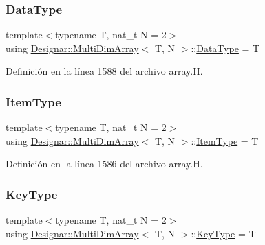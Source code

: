 \subsubsection{\texorpdfstring{Data\+Type}{DataType}}
{\footnotesize\ttfamily template$<$typename T, nat\+\_\+t N = 2$>$ \\
using \hyperlink{class_designar_1_1_multi_dim_array}{Designar\+::\+Multi\+Dim\+Array}$<$ T, N $>$\+::\hyperlink{class_designar_1_1_multi_dim_array_a23b3bec3a6a803d8ef7becceb592d6c0}{Data\+Type} =  T}



Definición en la línea 1588 del archivo array.\+H.

\mbox{\label{class_designar_1_1_multi_dim_array_a1b4c346c7e11cbada54447843d0c7880}} 
\subsubsection{\texorpdfstring{Item\+Type}{ItemType}}
{\footnotesize\ttfamily template$<$typename T, nat\+\_\+t N = 2$>$ \\
using \hyperlink{class_designar_1_1_multi_dim_array}{Designar\+::\+Multi\+Dim\+Array}$<$ T, N $>$\+::\hyperlink{class_designar_1_1_multi_dim_array_a1b4c346c7e11cbada54447843d0c7880}{Item\+Type} =  T}



Definición en la línea 1586 del archivo array.\+H.

\mbox{\label{class_designar_1_1_multi_dim_array_aa8c6b455e3cd5b74a57243a13553c6ff}} 
\subsubsection{\texorpdfstring{Key\+Type}{KeyType}}
{\footnotesize\ttfamily template$<$typename T, nat\+\_\+t N = 2$>$ \\
using \hyperlink{class_designar_1_1_multi_dim_array}{Designar\+::\+Multi\+Dim\+Array}$<$ T, N $>$\+::\hyperlink{class_designar_1_1_multi_dim_array_aa8c6b455e3cd5b74a57243a13553c6ff}{Key\+Type} =  T}



